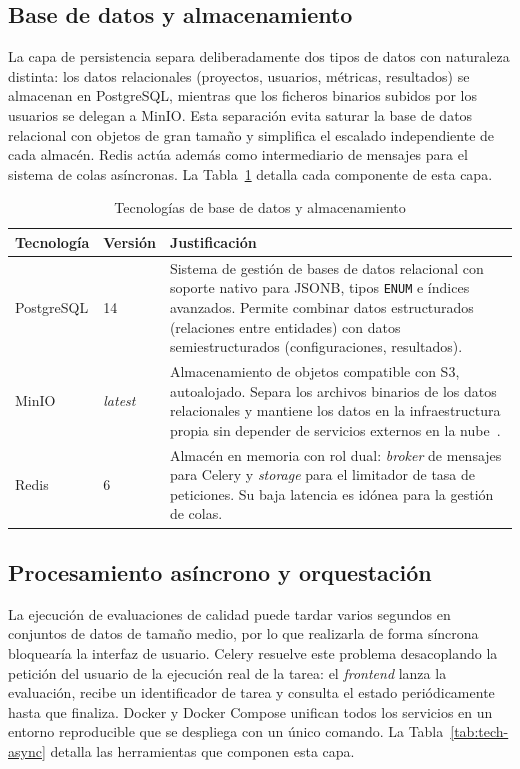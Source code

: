 \subsection{Base de datos y almacenamiento}
\label{sec:tech-bbdd}

La capa de persistencia separa deliberadamente dos tipos de datos con
naturaleza distinta: los datos relacionales (proyectos, usuarios, métricas,
resultados) se almacenan en PostgreSQL, mientras que los ficheros binarios
subidos por los usuarios se delegan a MinIO.  Esta separación evita saturar
la base de datos relacional con objetos de gran tamaño y simplifica el
escalado independiente de cada almacén.  Redis actúa además como
intermediario de mensajes para el sistema de colas asíncronas.
La Tabla~\ref{tab:tech-bbdd} detalla cada componente de esta capa.


\begin{table}[htbp]
  \centering
  \caption{Tecnologías de base de datos y almacenamiento}
  \label{tab:tech-bbdd}
  \begin{tabularx}{\textwidth}{l l X}
    \toprule
    \textbf{Tecnología} & \textbf{Versión} & \textbf{Justificación} \\
    \midrule
    PostgreSQL & 14  & Sistema de gestión de bases de datos relacional con
      soporte nativo para JSONB, tipos \texttt{ENUM} e índices avanzados.
      Permite combinar datos estructurados (relaciones entre entidades) con
      datos semiestructurados (configuraciones, resultados). \\
    MinIO     & \emph{latest} & Almacenamiento de objetos compatible con S3,
      autoalojado.  Separa los archivos binarios de los datos relacionales y
      mantiene los datos en la infraestructura propia sin depender de
      servicios externos en la nube~\citep{minio}. \\
    Redis     & 6    & Almacén en memoria con rol dual: \emph{broker} de
      mensajes para Celery y \emph{storage} para el limitador de tasa de
      peticiones.  Su baja latencia es idónea para la gestión de colas. \\
    \bottomrule
  \end{tabularx}
\end{table}

\subsection{Procesamiento asíncrono y orquestación}
\label{sec:tech-async}

La ejecución de evaluaciones de calidad puede tardar varios segundos en
conjuntos de datos de tamaño medio, por lo que realizarla de forma síncrona
bloquearía la interfaz de usuario.  Celery resuelve este problema
desacoplando la petición del usuario de la ejecución real de la tarea: el
\emph{frontend} lanza la evaluación, recibe un identificador de tarea y
consulta el estado periódicamente hasta que finaliza.  Docker y Docker
Compose unifican todos los servicios en un entorno reproducible que se
despliega con un único comando.
La Tabla~\ref{tab:tech-async} detalla las herramientas que componen esta
capa.


